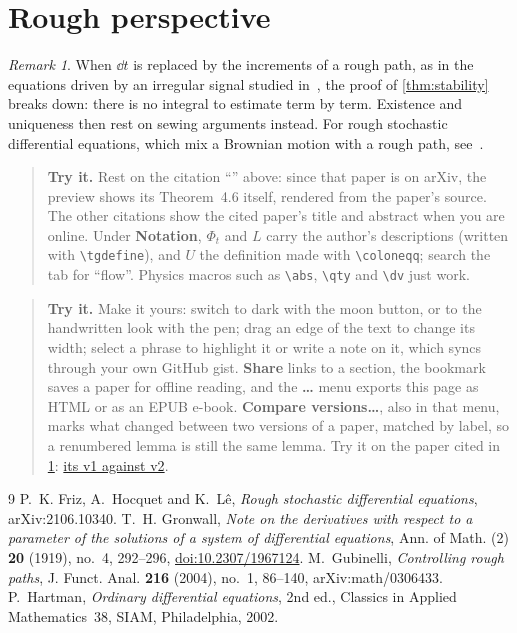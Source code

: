 \documentclass{amsart}
\theoremstyle{definition}
\theoremstyle{remark}
\newtheorem{remark}[theorem]{Remark}
\numberwithin{equation}{section}
\newenvironment{tryit}{\begin{quote}\small\textbf{Try it.}}{\end{quote}}
\begin{document}
\section{Rough perspective}\label{sec:rough}

\begin{remark}\label{rem:rough}
When $\dd{t}$ is replaced by the increments of a rough path, as in the
equations driven by an irregular signal studied in~\cite{gubinelli}, the
proof of \cref{thm:stability} breaks down: there is no integral to estimate
term by term. Existence and uniqueness then rest on sewing arguments instead.
For rough stochastic differential equations, which mix a Brownian motion with
a rough path, see~\cite[Theorem~4.6]{fhl}.
\end{remark}

\begin{tgonly}
\begin{tryit}
Rest on the citation ``\cite[Theorem~4.6]{fhl}'' above: since that paper is
on arXiv, the preview shows its Theorem~4.6 itself, rendered from the
paper's source. The other citations show the cited paper's title and
abstract when you are online. Under \textbf{Notation}, $\Phi_t$ and $L$ carry
the author's descriptions (written with \verb|\tgdefine|), and $U$ the
definition made with \verb|\coloneqq|; search the tab for ``flow''. Physics
macros such as \verb|\abs|, \verb|\qty| and \verb|\dv| just work.
\end{tryit}
\end{tgonly}

\begin{tgonly}
\begin{tryit}
Make it yours: switch to dark with the moon button, or to the handwritten
look with the pen; drag an edge of the text to change its width; select a
phrase to highlight it or write a note on it, which syncs through your own
GitHub gist. \textbf{Share} links to a section, the bookmark saves a paper
for offline reading, and the \textbf{\dots} menu exports this page as HTML
or as an EPUB e-book. \textbf{Compare versions\dots}, also in that menu,
marks what changed between two versions of a paper, matched by label, so a
renumbered lemma is still the same lemma. Try it on the paper cited in
\cref{rem:rough}: \href{?arxiv=2106.10340v2&compare=v1}{its v1 against v2}.
\end{tryit}
\end{tgonly}

\begin{thebibliography}{9}
 P.~K. Friz, A.~Hocquet and K.~L\^e, \emph{Rough stochastic
  differential equations}, arXiv:2106.10340.
 T.~H. Gronwall, \emph{Note on the derivatives with respect
  to a parameter of the solutions of a system of differential equations},
  Ann. of Math. (2) \textbf{20} (1919), no.~4, 292--296,
  \href{https://doi.org/10.2307/1967124}{doi:10.2307/1967124}.
 M.~Gubinelli, \emph{Controlling rough paths}, J. Funct.
  Anal. \textbf{216} (2004), no.~1, 86--140, arXiv:math/0306433.
 P.~Hartman, \emph{Ordinary differential equations}, 2nd
  ed., Classics in Applied Mathematics~38, SIAM, Philadelphia, 2002.
\end{thebibliography}
\end{document}
